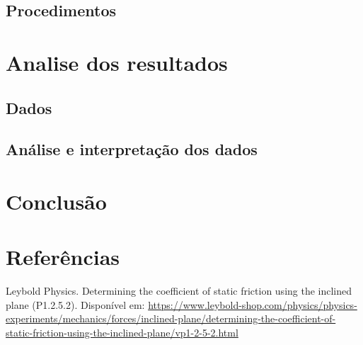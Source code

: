 \documentclass[aps,twocolumn,secnumarabic,balancelastpage,amsmath,amssymb,nofootinbib,floatfix]{revtex4-1}
\begin{document}
        \subsection{Procedimentos}
    
    \section{Analise dos resultados}
        \subsection{Dados}
        
        \subsection{Análise e interpretação dos dados}
    
    \section{Conclusão}
    
    \section{Referências}
    \begin{thebibliography}{9}
         Leybold Physics. Determining the coefficient of static friction using the inclined plane (P1.2.5.2). Disponível em: \url{https://www.leybold-shop.com/physics/physics-experiments/mechanics/forces/inclined-plane/determining-the-coefficient-of-static-friction-using-the-inclined-plane/vp1-2-5-2.html}
    \end{thebibliography}
\end{document}
